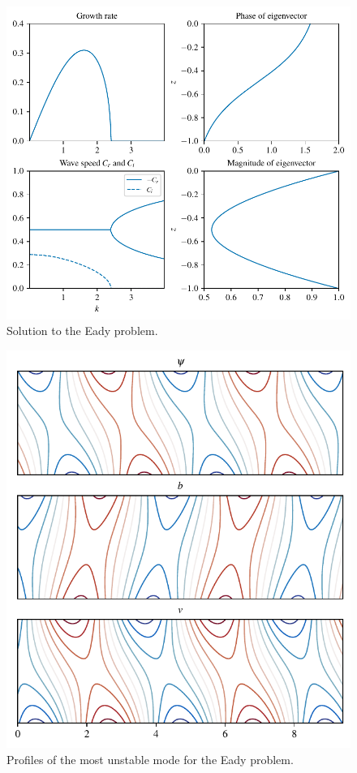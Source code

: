 \begin{figure}
    \centering
    \includegraphics{Eady_matchvallis}
    \caption{Solution to the Eady problem.}
    \label{fig:Eady_matchvallis}
\end{figure}

\begin{figure}
    \centering
    \includegraphics{Eady_profile}
    \caption{Profiles of the most unstable mode for the Eady problem.}
    \label{fig:Eady_profile}
\end{figure}

